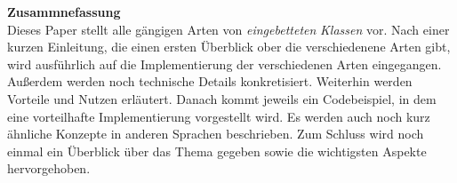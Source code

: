 \vspace*{2cm}
{\bf\Large Zusammnefassung} \\ [1em]
Dieses Paper stellt alle gängigen Arten von {\it eingebetteten} {\it Klassen} vor. Nach einer kurzen
Einleitung, die einen ersten Überblick ober die verschiedenene Arten gibt, wird ausführlich
auf die Implementierung der verschiedenen Arten eingegangen. Außerdem werden
noch technische Details konkretisiert. Weiterhin werden Vorteile und Nutzen erläutert.
Danach kommt jeweils ein Codebeispiel, in dem eine vorteilhafte Implementierung vorgestellt
wird. Es werden auch noch kurz ähnliche Konzepte in anderen Sprachen beschrieben.
Zum Schluss wird noch einmal ein Überblick über das Thema gegeben sowie die wichtigsten Aspekte hervorgehoben.


\clearpage
